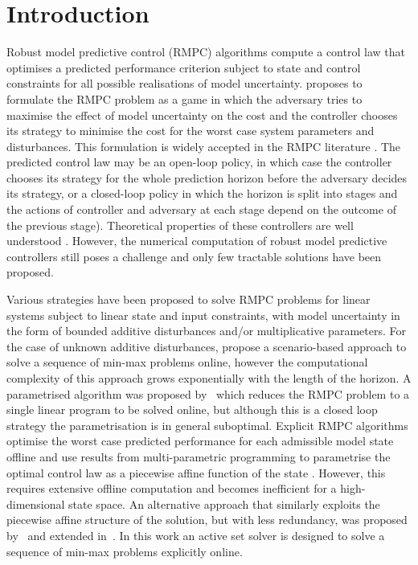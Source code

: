 \documentclass{ifacconf}
\begin{document}
\section{Introduction}\label{sec:intro}

Robust model predictive control (RMPC) algorithms compute a control law that optimises a predicted performance
criterion subject to state and control constraints for all possible realisations of model
uncertainty. \citet{Witsenhausen:1968} proposes to formulate the RMPC problem as a game in which the adversary
tries to maximise the effect of model uncertainty on the cost and the controller chooses its strategy to
minimise the cost for the worst case system parameters and disturbances. This formulation is widely accepted
in the RMPC literature \citep[e.g.][]{Bemporad:1999,Bemporad:2003,Lee:1997}.
The predicted control law may be an open-loop policy, in which case the controller chooses its strategy for
the whole prediction horizon before the adversary decides its strategy, or a closed-loop policy in which the
horizon is split into stages and the actions of controller and adversary at each stage depend on the
outcome of the previous stage). Theoretical properties of these controllers are well understood \citep[e.g.][]{Mayne:2000}. However, the numerical computation of robust model predictive controllers still poses
a challenge and only few tractable solutions have been proposed.

Various strategies have been proposed to solve RMPC problems for linear systems subject to linear state and
input constraints, with model uncertainty in the form of bounded additive disturbances and/or multiplicative
parameters. For the case of unknown additive disturbances, \citet{Scokaert:1998} propose a scenario-based
approach to solve a sequence of min-max problems online, however the computational complexity of this approach
grows exponentially with the length of the horizon. A parametrised algorithm was proposed
by~\cite{Rakovic:2012} which reduces the RMPC problem to a single linear program to be solved online, but
although this is a closed loop strategy the parametrisation is in general suboptimal. Explicit RMPC algorithms
optimise the worst case predicted performance for each admissible model state offline and
use results from multi-parametric programming to parametrise the optimal control law as a piecewise affine function of the
state \citep[e.g.][]{Bemporad:2003,Diehl:2004}. However, this requires extensive offline computation and
becomes inefficient for a high-dimensional state space.
An alternative approach that similarly exploits the piecewise affine structure of the solution, but with
less redundancy, was proposed by~\cite{Buerger:2011} and extended in~\cite{Buerger:ACC}. In this work an active set
solver is designed to solve a sequence of min-max problems explicitly online. 
\end{document}
